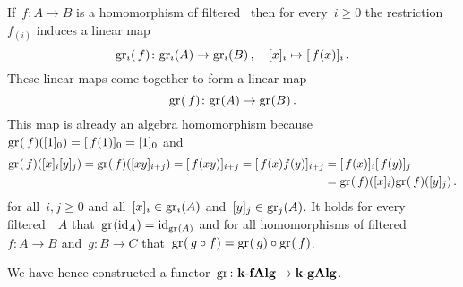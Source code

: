 \begin{construction}
  If~$f \colon A \to B$ is a homomorphism of filtered~{\algebras{$\kf$}} then for every~$i \geq 0$ the restriction~$f_{(i)}$ induces a linear map
  \[
    \gr[i](\spacing f)
    \colon
    \gr[i](A)
    \to
    \gr[i](B) \,,
    \quad
    [x]_i
    \mapsto
    [\spacing f(x)]_i  \,.
  \]
  These linear maps come together to form a linear map
  \[
    \gr(\spacing f)
    \colon
    \gr(A)
    \to
    \gr(B)  \,.
  \]
  This map is already an algebra homomorphism because~$\gr(\spacing f)([1]_0) = [\spacing f(1)]_0 = [1]_0$ and
  \begin{align*}
    \gr(\spacing f)( [x]_i [y]_j )
    =
    \gr(\spacing f)( [xy]_{i+j} )
    =
    [\spacing f(xy)]_{i+j}
    =
    [\spacing f(x) f(y)]_{i+j}
    &=
    [\spacing f(x)]_i [\spacing f(y)]_j
    \\
    &=
    \gr(\spacing f)([x]_i) \gr(\spacing f)([y]_j) \,.
  \end{align*}
  for all~$i, j \geq 0$ and all~$[x]_i \in \gr[i](A)$ and~$[y]_j \in \gr[j](A)$.  
  It holds for every filtered~{\algebra{$\kf$}}~$A$ that~$\gr(\id_A) = \id_{\gr(A)}$ and for all homomorphisms of filtered~{\algebras{$\kf$}}~$f \colon A \to B$ and~$g \colon B \to C$ that~$\gr(\spacing g \circ f) = \gr(\spacing g) \circ \gr(\spacing f)$.
  
  We have hence constructed a functor~$\gr \colon \cfAlg{\kf} \to \cgAlg{\kf}$.
\end{construction}



% 
% 
% 

